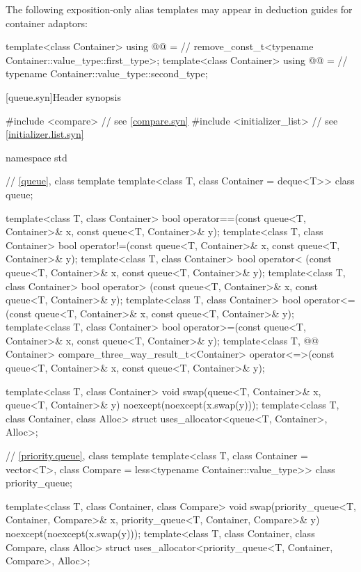 \pnum
The following exposition-only alias templates may appear in deduction guides
for container adaptors:
\begin{codeblock}
template<class Container>
  using @@ =                                // \expos
    remove_const_t<typename Container::value_type::first_type>;
template<class Container>
  using @@ =                             // \expos
    typename Container::value_type::second_type;
\end{codeblock}

[queue.syn]{Header  synopsis}

\begin{codeblock}
#include <compare>              // see \ref{compare.syn}
#include <initializer_list>     // see \ref{initializer.list.syn}

namespace std {
  // \ref{queue}, class template 
  template<class T, class Container = deque<T>> class queue;

  template<class T, class Container>
    bool operator==(const queue<T, Container>& x, const queue<T, Container>& y);
  template<class T, class Container>
    bool operator!=(const queue<T, Container>& x, const queue<T, Container>& y);
  template<class T, class Container>
    bool operator< (const queue<T, Container>& x, const queue<T, Container>& y);
  template<class T, class Container>
    bool operator> (const queue<T, Container>& x, const queue<T, Container>& y);
  template<class T, class Container>
    bool operator<=(const queue<T, Container>& x, const queue<T, Container>& y);
  template<class T, class Container>
    bool operator>=(const queue<T, Container>& x, const queue<T, Container>& y);
  template<class T, @@ Container>
    compare_three_way_result_t<Container>
      operator<=>(const queue<T, Container>& x, const queue<T, Container>& y);

  template<class T, class Container>
    void swap(queue<T, Container>& x, queue<T, Container>& y) noexcept(noexcept(x.swap(y)));
  template<class T, class Container, class Alloc>
    struct uses_allocator<queue<T, Container>, Alloc>;

  // \ref{priority.queue}, class template 
  template<class T, class Container = vector<T>,
           class Compare = less<typename Container::value_type>>
    class priority_queue;

  template<class T, class Container, class Compare>
    void swap(priority_queue<T, Container, Compare>& x,
              priority_queue<T, Container, Compare>& y) noexcept(noexcept(x.swap(y)));
  template<class T, class Container, class Compare, class Alloc>
    struct uses_allocator<priority_queue<T, Container, Compare>, Alloc>;
}
\end{codeblock}

